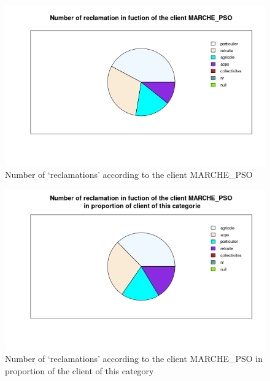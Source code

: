 \documentclass[a4paper, 11pt]{article}
\begin{document}
    \begin{figure}[!ht]
    	\centering
            \includegraphics[height = 10 cm]{Valentin/Number_of_reclamation_in_fuction_of_the_client_MARCHE_PSO.png}
            \caption{Number of `reclamations' according to the client MARCHE\_PSO}
            \label{fig:reclamtion_pso1}
    \end{figure}
    
    \begin{figure}[!ht]
    	\centering
            \includegraphics[height = 10 cm]{Valentin/Number_of_reclamation_in_fuction_of_the_client_MARCHE_PSO_proportion.png}
            \caption{Number of `reclamations' according to the client MARCHE\_PSO in proportion of the client of this category}
            \label{fig:reclamtion_pso2}
    \end{figure}
    
\end{document}
